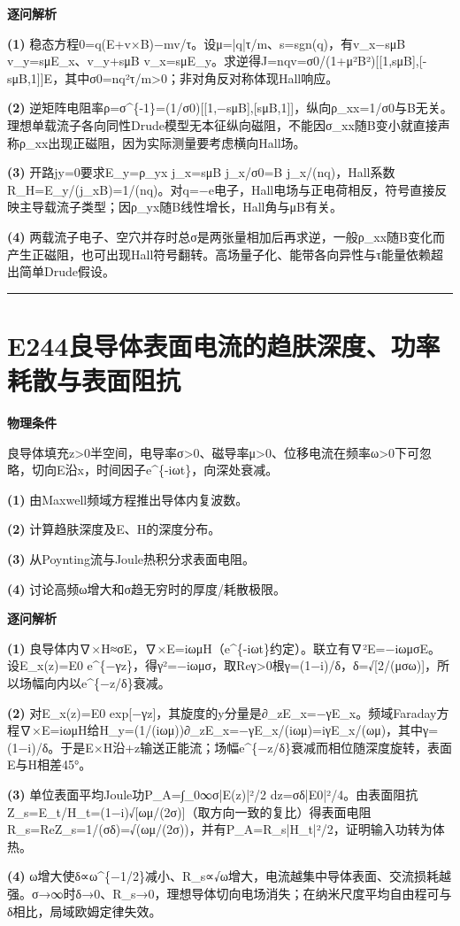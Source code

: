 \documentclass[UTF8,a4paper,11pt,oneside,openany]{ctexbook}
\begin{document}
\par\medskip\noindent\textbf{逐问解析}
\par\noindent\textbf{(1)} 稳态方程0=q(E+v×B)−mv/τ。设μ=|q|τ/m、s=sgn(q)，有v\_x−sμB v\_y=sμE\_x、v\_y+sμB v\_x=sμE\_y。求逆得J=nqv=σ0/(1+μ²B²)[[1,sμB],[-sμB,1]]E，其中σ0=nq²τ/m>0；非对角反对称体现Hall响应。
\par\noindent\textbf{(2)} 逆矩阵电阻率ρ=σ\textasciicircum{}\{-1\}=(1/σ0)[[1,−sμB],[sμB,1]]，纵向ρ\_xx=1/σ0与B无关。理想单载流子各向同性Drude模型无本征纵向磁阻，不能因σ\_xx随B变小就直接声称ρ\_xx出现正磁阻，因为实际测量要考虑横向Hall场。
\par\noindent\textbf{(3)} 开路jy=0要求E\_y=ρ\_yx j\_x=sμB j\_x/σ0=B j\_x/(nq)，Hall系数R\_H=E\_y/(j\_xB)=1/(nq)。对q=−e电子，Hall电场与正电荷相反，符号直接反映主导载流子类型；因ρ\_yx随B线性增长，Hall角与μB有关。
\par\noindent\textbf{(4)} 两载流子电子、空穴并存时总σ是两张量相加后再求逆，一般ρ\_xx随B变化而产生正磁阻，也可出现Hall符号翻转。高场量子化、能带各向异性与τ能量依赖超出简单Drude假设。

\par\bigskip\hrule\bigskip
\section*{E244\quad 良导体表面电流的趋肤深度、功率耗散与表面阻抗}
\textbf{物理条件}\par 良导体填充z>0半空间，电导率σ>0、磁导率μ>0、位移电流在频率ω>0下可忽略，切向E沿x，时间因子e\textasciicircum{}\{-iωt\}，向深处衰减。
\par\noindent\textbf{(1)} 由Maxwell频域方程推出导体内复波数。
\par\noindent\textbf{(2)} 计算趋肤深度及E、H的深度分布。
\par\noindent\textbf{(3)} 从Poynting流与Joule热积分求表面电阻。
\par\noindent\textbf{(4)} 讨论高频ω增大和σ趋无穷时的厚度/耗散极限。

\par\medskip\noindent\textbf{逐问解析}
\par\noindent\textbf{(1)} 良导体内∇×H≈σE，∇×E=iωμH（e\textasciicircum{}\{-iωt\}约定）。联立有∇²E=−iωμσE。设E\_x(z)=E0 e\textasciicircum{}\{−γz\}，得γ²=−iωμσ，取Reγ>0根γ=(1−i)/δ，δ=√[2/(μσω)]，所以场幅向内以e\textasciicircum{}\{−z/δ\}衰减。
\par\noindent\textbf{(2)} 对E\_x(z)=E0 exp[−γz]，其旋度的y分量是∂\_zE\_x=−γE\_x。频域Faraday方程∇×E=iωμH给H\_y=(1/(iωμ))∂\_zE\_x=−γE\_x/(iωμ)=iγE\_x/(ωμ)，其中γ=(1−i)/δ。于是E×H沿+z输送正能流；场幅e\textasciicircum{}\{−z/δ\}衰减而相位随深度旋转，表面E与H相差45°。
\par\noindent\textbf{(3)} 单位表面平均Joule功P\_A=∫\_0∞σ|E(z)|²/2 dz=σδ|E0|²/4。由表面阻抗Z\_s=E\_t/H\_t=(1−i)√[ωμ/(2σ)]（取方向一致的复比）得表面电阻R\_s=ReZ\_s=1/(σδ)=√(ωμ/(2σ))，并有P\_A=R\_s|H\_t|²/2，证明输入功转为体热。
\par\noindent\textbf{(4)} ω增大使δ∝ω\textasciicircum{}\{−1/2\}减小、R\_s∝√ω增大，电流越集中导体表面、交流损耗越强。σ→∞时δ→0、R\_s→0，理想导体切向电场消失；在纳米尺度平均自由程可与δ相比，局域欧姆定律失效。
\end{document}
